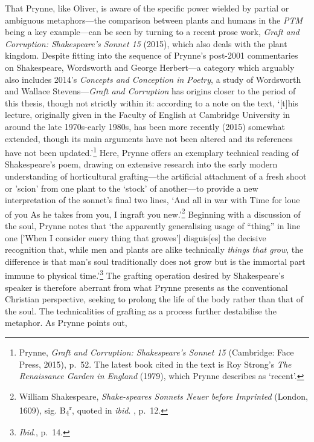 \documentclass[]{article}
\begin{document}
That Prynne, like Oliver, is aware of the specific power wielded by
partial or ambiguous metaphors---the comparison between plants and
humans in the \emph{PTM} being a key example---can be seen by turning to
a recent prose work, \emph{Graft and Corruption: Shakespeare's Sonnet
15} (2015), which also deals with the plant kingdom. Despite fitting
into the sequence of Prynne's post-2001 commentaries on Shakespeare,
Wordsworth and George Herbert---a category which arguably also includes
2014's \emph{Concepts and Conception in Poetry}, a study of Wordsworth
and Wallace Stevens---\emph{Graft and Corruption} has origins closer to
the period of this thesis, though not strictly within it: according to a
note on the text, `{[}t{]}his lecture, originally given in the Faculty
of English at Cambridge University in around the late 1970s-early 1980s,
has been more recently (2015) somewhat extended, though its main
arguments have not been altered and its references have not been
updated.'\footnote{Prynne, \emph{Graft and Corruption: Shakespeare's
  Sonnet 15} (Cambridge: Face Press, 2015), p.~52. The latest book cited
  in the text is Roy Strong's \emph{The Renaissance Garden in England}
  (1979), which Prynne describes as `recent'.} Here, Prynne offers an
exemplary technical reading of Shakespeare's poem, drawing on extensive
research into the early modern understanding of horticultural
grafting---the artificial attachment of a fresh shoot or 'scion' from
one plant to the `stock' of another---to provide a new interpretation of
the sonnet's final two lines, `And all in war with Time for loue of you
\textbar{} As he takes from you, I ingraft you new.'\footnote{William
  Shakespeare, \emph{Shake-speares Sonnets Neuer before Imprinted}
  (London, 1609), sig. B\textsubscript{4}\textsuperscript{r}, quoted in
  \emph{ibid}. , p.~12.} Beginning with a discussion of the soul, Prynne
notes that `the apparently generalising usage of ``thing'' in line one
{[}'When I consider euery thing that growes'{]} disguis{[}es{]} the
decisive recognition that, while men and plants are alike technically
\emph{things that grow}, the difference is that man's soul traditionally
does not grow but is the immortal part immune to physical
time.'\footnote{\emph{Ibid}., p.~14.} The grafting operation desired by
Shakespeare's speaker is therefore aberrant from what Prynne presents as
the conventional Christian perspective, seeking to prolong the life of
the body rather than that of the soul. The technicalities of grafting as
a process further destabilise the metaphor. As Prynne points out,
\end{document}
